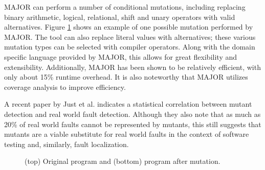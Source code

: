 MAJOR can perform a number of conditional mutations, including replacing
binary arithmetic, logical, relational, shift and unary operators with
valid alternatives.  Figure \ref{majorex} shows an example of one
possible mutation performed by MAJOR.  The tool can also replace literal
values with alternatives; these various mutation types can be selected
with compiler operators.  Along with the domain specific language
provided by MAJOR, this allows for great flexibility and extensibility.
Additionally, MAJOR has been shown to be relatively efficient, with only
about 15\% runtime overhead.  It is also noteworthy that MAJOR utilizes
coverage analysis to improve efficiency.

A recent paper by Just et al. \cite{mutants} indicates a statistical
correlation between mutant detection and real world fault detection.
Although they also note that as much as 20\% of real world faults cannot
be represented by mutants, this still suggests that mutants are a viable
substitute for real world faults in the context of software testing and,
similarly, fault localization.

\begin{figure}[tbp]
  \centering
  
  
  \caption{(top) Original program and (bottom) program after mutation.}
  \label{majorex}
\end{figure}